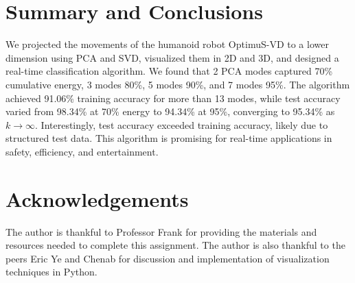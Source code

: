 \documentclass[11pt]{amsart}
\begin{document}
\section{Summary and Conclusions}\label{sec:Conclusions}


We projected the movements of the humanoid robot OptimuS-VD to a lower dimension using PCA and SVD, visualized them in 2D and 3D, and designed a real-time classification algorithm. We found that 2 PCA modes captured 70\% cumulative energy, 3 modes 80\%, 5 modes 90\%, and 7 modes 95\%. The algorithm achieved 91.06\% training accuracy for more than 13 modes, while test accuracy varied from 98.34\% at 70\% energy to 94.34\% at 95\%, converging to 95.34\% as \( k \to \infty \). Interestingly, test accuracy exceeded training accuracy, likely due to structured test data. This algorithm is promising for real-time applications in safety, efficiency, and entertainment.

\section*{Acknowledgements}

The author is thankful to Professor Frank for providing the materials and resources needed to complete this assignment. The author is also thankful to the peers Eric Ye and Chenab for discussion and implementation of visualization techniques in Python.



\end{document}
